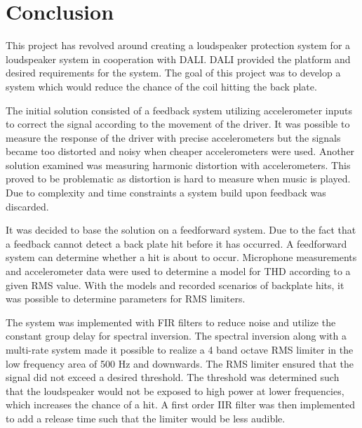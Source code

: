 \chapter{Conclusion}\label{cha:conclusion}
This project has revolved around creating a loudspeaker protection system for a loudspeaker system in cooperation with DALI. DALI provided the platform and desired requirements for the system. The goal of this project was to develop a system which would reduce the chance of the coil hitting the back plate.

The initial solution consisted of a feedback system utilizing accelerometer inputs to correct the signal according to the movement of the driver. It was possible to measure the response of the driver with precise accelerometers but the signals became too distorted and noisy when cheaper accelerometers were used. Another solution examined was measuring harmonic distortion with accelerometers. This proved to be problematic as distortion is hard to measure when music is played. Due to complexity and time constraints a system build upon feedback was discarded.


It was decided to base the solution on a feedforward system. Due to the fact that a feedback cannot detect a back plate hit before it has occurred. A feedforward system can determine whether a hit is about to occur. Microphone measurements and accelerometer data were used to determine a model for THD according to a given RMS value. With the models and recorded scenarios of backplate hits, it was possible to determine parameters for RMS limiters.


The system was implemented with FIR filters to reduce noise and utilize the constant group delay for spectral inversion. The spectral inversion along with a multi-rate system made it possible to realize a 4 band octave RMS limiter in the low frequency area of 500 Hz and downwards. The RMS limiter ensured that the signal did not exceed a desired threshold. The threshold was determined such that the loudspeaker would not be exposed to high power at lower frequencies, which increases the chance of a hit. A first order IIR filter was then implemented to add a release time such that the limiter would be less audible.
 
